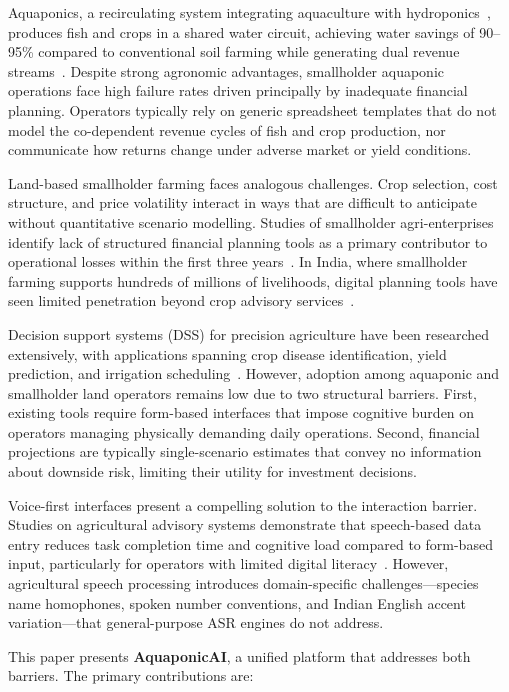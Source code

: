 \documentclass[runningheads]{llncs}
\begin{document}
Aquaponics, a recirculating system integrating aquaculture with
hydroponics~\cite{ref1,ref21,ref22}, produces fish and crops in a shared
water circuit, achieving water savings of 90--95\% compared to
conventional soil farming while generating dual revenue
streams~\cite{ref7}. Despite
strong agronomic advantages, smallholder aquaponic operations face high
failure rates driven principally by inadequate financial planning.
Operators typically rely on generic spreadsheet templates that do not
model the co-dependent revenue cycles of fish and crop production, nor
communicate how returns change under adverse market or yield conditions.

Land-based smallholder farming faces analogous challenges. Crop
selection, cost structure, and price volatility interact in ways that
are difficult to anticipate without quantitative scenario modelling.
Studies of smallholder agri-enterprises identify lack of structured
financial planning tools as a primary contributor to operational
losses within the first three years~\cite{ref4,ref35}.
In India, where smallholder farming supports hundreds of millions of
livelihoods, digital planning tools have seen limited penetration
beyond crop advisory services~\cite{ref18}.

Decision support systems (DSS) for precision agriculture have been
researched extensively, with applications spanning crop disease
identification, yield prediction, and irrigation
scheduling~\cite{ref2,ref15}. However, adoption among aquaponic and
smallholder land operators remains low due to two structural barriers.
First, existing tools require form-based interfaces that impose
cognitive burden on operators managing physically demanding daily
operations. Second, financial projections are typically single-scenario
estimates that convey no information about downside risk, limiting
their utility for investment decisions.

Voice-first interfaces present a compelling solution to the interaction
barrier. Studies on agricultural advisory systems demonstrate that
speech-based data entry reduces task completion time and cognitive
load compared to form-based input, particularly for operators with
limited digital literacy~\cite{ref3,ref20,ref30}. However, agricultural speech
processing introduces domain-specific challenges---species name
homophones, spoken number conventions, and Indian English accent
variation---that general-purpose ASR engines do not address.

This paper presents \textbf{AquaponicAI}, a unified platform that
addresses both barriers. The primary contributions are:
\end{document}
